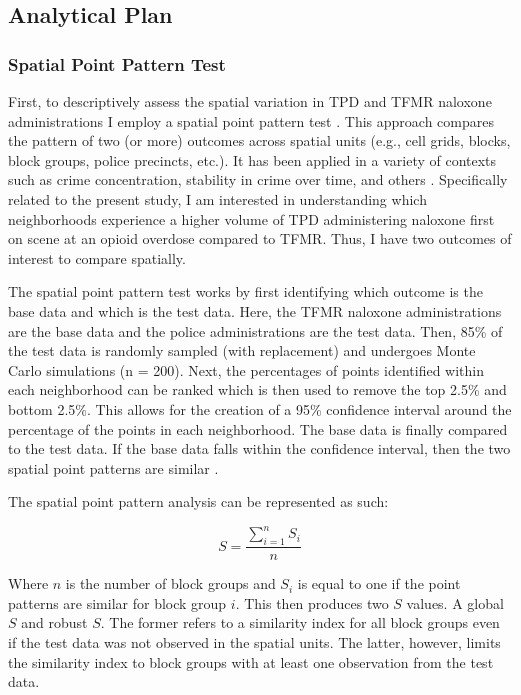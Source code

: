 \subsection{Analytical Plan}
\subsubsection{Spatial Point Pattern Test}

First, to descriptively assess the spatial variation in TPD and TFMR naloxone administrations I employ a spatial point pattern test \parencite{andresen_testing_2009}. This approach compares the pattern of two (or more) outcomes across spatial units (e.g., cell grids, blocks, block groups, police precincts, etc.). It has been applied in a variety of contexts such as crime concentration, stability in crime over time, and others \parencite{andresen_crime_2017, ha_spatial_2020, ratcliffe_detecting_2005}. Specifically related to the present study, I am interested in understanding which neighborhoods experience a higher volume of TPD administering naloxone first on scene at an opioid overdose compared to TFMR. Thus, I have two outcomes of interest to compare spatially. 

The spatial point pattern test works by first identifying which outcome is the base data and which is the test data. Here, the TFMR naloxone administrations are the base data and the police administrations are the test data. Then, 85\% of the test data is randomly sampled (with replacement) and undergoes Monte Carlo simulations (n = 200). Next, the percentages of points identified within each neighborhood can be ranked which is then used to remove the top 2.5\% and bottom 2.5\%. This allows for the creation of a 95\% confidence interval around the percentage of the points in each neighborhood. The base data is finally compared to the test data. If the base data falls within the confidence interval, then the two spatial point patterns are similar \parencite{andresen_testing_2009}.

The spatial point pattern analysis can be represented as such:

\[
    S = \frac{\sum_{i=1}^n S_i}{n}
\]

\noindent Where \(n\) is the number of block groups and \(S_i\) is equal to one if the point patterns are similar for block group \(i\). This then produces two \(S\) values. A global \(S\) and robust \(S\). The former refers to a similarity index for all block groups even if the test data was not observed in the spatial units. The latter, however, limits the similarity index to block groups with at least one observation from the test data. 

